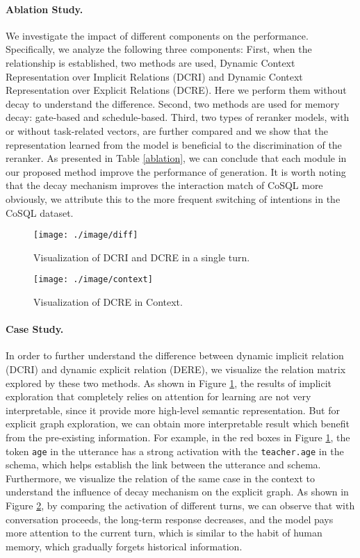 \documentclass[letterpaper]{article} \usepackage{aaai21}  \usepackage{times}  \usepackage{helvet} \usepackage{courier}  \usepackage[hyphens]{url}  \usepackage{graphicx} \urlstyle{rm} \def\UrlFont{\rm}  \usepackage{natbib}  \usepackage{caption} \frenchspacing  \setlength{\pdfpagewidth}{8.5in}  \setlength{\pdfpageheight}{11in}
\begin{document}
\paragraph{Ablation Study.} We investigate the impact of different components on the  performance. 
Specifically, we analyze the following three components:
First, when the relationship is established, two methods are used, Dynamic Context Representation over Implicit Relations (DCRI) and Dynamic Context Representation over Explicit Relations (DCRE). 
Here we perform them without decay to understand the difference.
Second, two methods are used for memory decay: gate-based and schedule-based. 
Third, two types of reranker models, with or without task-related vectors, are further compared and we show that the representation learned from the model is beneficial to the discrimination of the reranker.
As presented in Table \ref{ablation}, we can conclude that each module in our proposed method improve the performance of generation.
It is worth noting that the decay mechanism improves the interaction match of CoSQL more obviously, we attribute this to the more frequent switching of intentions in the CoSQL dataset.

\begin{figure}
	\centering
	\texttt{[image: ./image/diff]}
	\caption{Visualization of DCRI and DCRE in a single turn.}
	\label{diff}
\end{figure}

\begin{figure}
	\centering
	\texttt{[image: ./image/context]}
	\caption{Visualization of DCRE in Context.}
	\label{ex_context}
\end{figure}

\paragraph{Case Study.} In order to further understand the difference between dynamic implicit relation (DCRI) and dynamic explicit relation (DERE), we visualize the relation matrix explored by these two methods. 
As shown in Figure \ref{diff}, the results of implicit exploration that completely relies on attention for learning are not very interpretable, since it provide more high-level semantic representation.
But for explicit graph exploration, we can obtain more interpretable result which benefit from the pre-existing information.
For example, in the red boxes in Figure \ref{diff}, the token \texttt{age} in the utterance has a strong activation with the \texttt{teacher.age} in the schema, which helps establish the link between the utterance and schema.
Furthermore, we visualize the relation of the same case in the context to understand the influence of decay mechanism on the explicit graph.
As shown in Figure \ref{ex_context}, by comparing the activation of different turns, we can observe that with conversation proceeds, the long-term response decreases, and the model pays more attention to the current turn, which is similar to the habit of human memory, which gradually forgets historical information.
\end{document}
